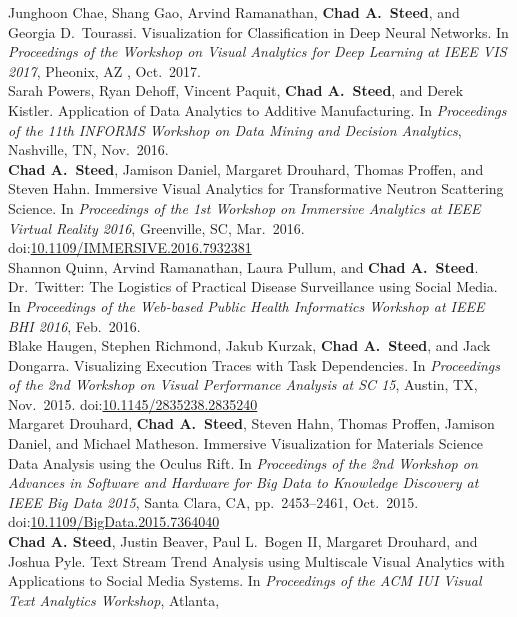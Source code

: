 \documentclass[11pt, letterpaper]{article}
\newcommand{\years}[1]{\marginnote{\scriptsize #1}}
\begin{document}
\begin{sloppypar}
\noindent\years{2017}Junghoon Chae, Shang Gao, Arvind Ramanathan, \textbf{Chad A.\ Steed}, and Georgia D.\ Tourassi. Visualization for Classification in Deep Neural Networks. In \emph{Proceedings of the Workshop on Visual Analytics for Deep Learning at IEEE VIS 2017}, Pheonix, AZ , Oct.\ 2017.\\
\years{2016}Sarah Powers, Ryan Dehoff, Vincent Paquit,
\textbf{Chad A.\ Steed}, and Derek Kistler. Application of Data Analytics
to Additive Manufacturing.
In \emph{Proceedings of the 11th INFORMS Workshop on Data Mining and
Decision Analytics}, Nashville, TN, Nov.\ 2016.\\
\years{2016}\textbf{Chad A.\ Steed}, Jamison Daniel, Margaret
Drouhard, Thomas Proffen, and Steven Hahn. Immersive Visual Analytics for
Transformative Neutron Scattering Science.
In \emph{Proceedings of the 1st Workshop on Immersive Analytics at IEEE Virtual
Reality 2016}, Greenville, SC, Mar.\ 2016. doi:\href{https://doi.org/10.1109/IMMERSIVE.2016.7932381}
{10.1109/IMMERSIVE.2016.7932381}\\
\years{2016}Shannon Quinn, Arvind Ramanathan, Laura Pullum, and
\textbf{Chad A.\ Steed}. Dr.\ Twitter: The Logistics of Practical Disease
Surveillance using Social Media.
In \emph{Proceedings of the Web-based Public Health Informatics Workshop at
IEEE BHI 2016}, Feb.\ 2016.\\
\years{2015}Blake Haugen, Stephen Richmond, Jakub Kurzak,
\textbf{Chad A.\ Steed}, and Jack Dongarra. Visualizing Execution Traces
with Task Dependencies.
In \emph{Proceedings of the 2nd Workshop on Visual Performance Analysis at SC 15}, Austin, TX, Nov.\ 2015.
doi:\href{http://dx.doi.org/10.1145/2835238.2835240}
{10.1145/2835238.2835240}\\
\years{2015}Margaret Drouhard, \textbf{Chad A.\ Steed}, Steven Hahn,
Thomas Proffen, Jamison Daniel, and Michael Matheson. Immersive Visualization
for Materials Science Data Analysis using the Oculus Rift.
In \emph{Proceedings of the 2nd Workshop on Advances in Software and Hardware for Big Data to Knowledge Discovery at IEEE Big Data 2015}, Santa Clara, CA, pp.\ 2453--2461, Oct.\ 2015. doi:\href{http://dx.doi.org/10.1109/BigData.2015.7364040}{10.1109/BigData.2015.7364040}\\
\years{2015}\textbf{Chad A. Steed}, Justin Beaver, Paul L.\ Bogen II,
Margaret Drouhard, and Joshua Pyle.  Text Stream Trend Analysis using
Multiscale Visual Analytics with Applications to Social Media Systems.
In \emph{Proceedings of the ACM IUI Visual Text Analytics Workshop}, Atlanta,

\end{sloppypar}
\end{document}
